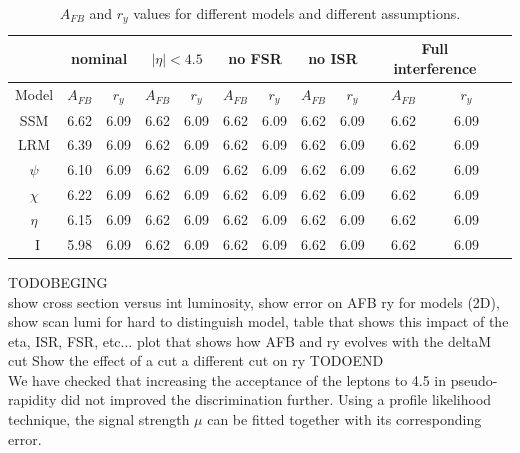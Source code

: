 \begin{table}
\centering
\begin{tabular}{| c | c | c | c | c | c | c | c | c | c | c | c |} \hline\hline
 & \multicolumn{2}{c|}{nominal}  & \multicolumn{2}{c|}{$|\eta|<4.5$} & \multicolumn{2}{c|}{no FSR} & \multicolumn{2}{c|}{no ISR} & \multicolumn{2}{c|}{Full interference}\\

\hline
  Model &  $A_{FB}$   &  $r_y$   &  $A_{FB}$   &  $r_y$&  $A_{FB}$   &  $r_y$&  $A_{FB}$   &  $r_y$&  $A_{FB}$   &  $r_y$ \\
\hline
SSM    &     6.62     &  6.09   &     6.62     &  6.09&     6.62     &  6.09&     6.62     &  6.09&     6.62     &  6.09      \\
LRM    &   6.39       &  6.09   &     6.62     &  6.09&     6.62     &  6.09&     6.62     &  6.09&     6.62     &  6.09 \\
$\psi$    &  6.10   &  6.09   &     6.62     &  6.09&     6.62     &  6.09&     6.62     &  6.09&     6.62     &  6.09   \\
$\chi$   &  6.22    &  6.09   &     6.62     &  6.09&     6.62     &  6.09&     6.62     &  6.09&     6.62     &  6.09    \\
$\eta$   &  6.15     &  6.09   &     6.62     &  6.09&     6.62     &  6.09&     6.62     &  6.09&     6.62     &  6.09    \\
~I        & 5.98   &  6.09   &     6.62     &  6.09&     6.62     &  6.09&     6.62     &  6.09&     6.62     &  6.09   \\
\hline\hline
\end{tabular}
\caption{$A_{FB}$ and $r_y$ values for different models and different assumptions.}
\label{tab:leptonicresonances:comp}
\end{table}


\label{subsubsection:results}
TODOBEGING\\
show cross section versus int luminosity, show error on AFB ry for models (2D), show scan lumi for hard to distinguish model, table that shows this impact of the eta, ISR, FSR, etc...
plot that shows how AFB and ry evolves with the deltaM cut
Show the effect of a cut a different cut on ry
TODOEND\\

We have checked that increasing the acceptance of the leptons to 4.5 in pseudo-rapidity did not improved the discrimination further. 
Using a profile likelihood technique, the signal strength $\mu$ can be fitted together with its corresponding error. 


